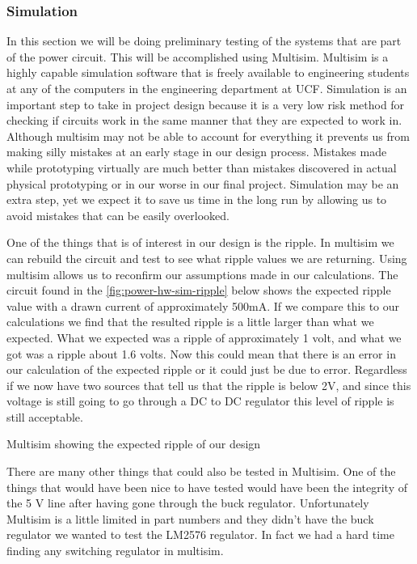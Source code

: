 \subsubsection{Simulation}
In this section we will be doing preliminary testing of the systems that are
part of the power circuit. This will be accomplished using Multisim. Multisim
is a highly capable simulation software that is freely available to engineering
students at any of the computers in the engineering department at UCF.
Simulation is an important step to take in project design because it is a very
low risk method for checking if circuits work in the same manner that they are
expected to work in. Although multisim may not be able to account for
everything it prevents us from making silly mistakes at an early stage in our
design process. Mistakes made while prototyping virtually are much better than
mistakes discovered in actual physical prototyping or in our worse in our final
project. Simulation may be an extra step, yet we expect it to save us time in
the long run by allowing us to avoid mistakes that can be easily overlooked.

One of the things that is of interest in our design is the ripple. In multisim
we can rebuild the circuit and test to see what ripple values we are returning.
Using multisim allows us to reconfirm our assumptions made in our calculations.
The circuit found in the \autoref{fig:power-hw-sim-ripple} below shows the expected ripple
value with a drawn current of approximately 500mA. If we compare this to our
calculations we find that the resulted ripple is a little larger than what we
expected. What we expected was a ripple of approximately 1 volt, and what we
got was a ripple about 1.6 volts.  Now this could mean that there is an error
in our calculation of the expected ripple or it could just be due to error.
Regardless if we now have two sources that tell us that the ripple is below 2V,
and since this voltage is still going to go through a DC to DC regulator this
level of ripple is still acceptable.

{Multisim showing the expected ripple of our design}

There are many other things that could also be tested in Multisim. One of the
things that would have been nice to have tested would have been the integrity
of the 5 V line after having gone through the buck regulator. Unfortunately
Multisim is a little limited in part numbers and they didn{}'t have the buck
regulator we wanted to test the LM2576 regulator. In fact we had a hard time
finding any switching regulator in multisim.

